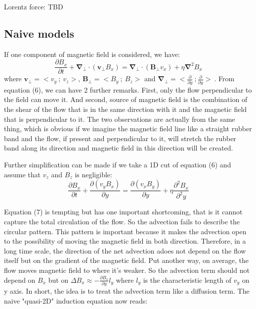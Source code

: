 \documentclass[11pt]{article}
\begin{document}
Lorentz force: TBD

\subsection{Naive models}

If one component of magnetic field is  considered, we have:
\begin{equation} 
\frac{\partial B_x}{\partial t} + \bm{\nabla_{\bot} \cdot}(\bm{v}_{\bot}B_x)   = \bm{\nabla_{\bot} \cdot}(\bm{B}_{\bot}v_x) + \eta \bm{{\nabla}} ^2 B_x
\label{eq:ind}
\end{equation}
where $\bm{v}_{\bot} = <v_y \ ; \ v_z>$, $ \bm{B}_{\bot} = <B_y \ ; \ B_z>$ and $\bm{\nabla_{\bot}}= <\frac{\partial}{\partial y} \ ;  \frac{\partial}{\partial y} > \ $. From equation (6), we can have 2 further remarks. First, only the flow perpendicular to the field can move it. And second, source of magnetic field is the combination of the shear of the flow that is in the same direction with it and the magnetic field that is perpendicular to it. The two observations are actually from the same thing, which is obvious if we imagine the magnetic field line like a straight rubber band and the flow, if present and perpendicular to it, will stretch the rubber band along its direction and magnetic field in this direction will be created.

Further simplification can be made if we take a 1D cut of equation (6) and assume that $v_z $ and $B_z$ is negligible: 
\begin{equation}
\frac{\partial B_x}{\partial t} +  \frac{\partial({v}_y B_x)}{\partial y}
  = \frac{\partial(v_x B_y)}{\partial y}+ \eta{\frac{\partial^2 B_x}{\partial^2 y}}
\end{equation}

Equation (7) is tempting but has one important shortcoming, that is it cannot capture the total circulation of the flow. So the advection fails to describe the circular pattern. This pattern is important because it makes the advection open to the possibility of moving the magnetic field in both direction. Therefore, in a long time scale, the direction of the net advection adoes not depend on the flow itself but on the gradient of the magnetic field. Put another way, on average, the flow moves magnetic field to where it's weaker. So the advection term should not depend on $B_x$ but on $\Delta B_x \approx -\frac{\partial B_x}{\partial y} l_y $ where $l_y$ is the characteristic length of $v_y$ on y axis. In short, the idea is to treat the advection term like a diffusion term. The naive "quasi-2D" induction equation now reads:
\end{document}
